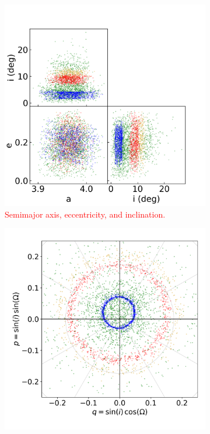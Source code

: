 \documentclass[a4paper,fleqn]{cas-sc}
\begin{document}
\begin{linenumbers}
\begin{figure}
    \centering
    \begin{subfigure}[t]{0.48\textwidth}
        \centering
        \includegraphics[width=\linewidth]{figure2a.png} 
        \caption{\textcolor{red}{Semimajor axis, eccentricity, and inclination.
}} \label{fig:plot_aei_allgroups_15.69}
    \end{subfigure}
    \hfill
    \begin{subfigure}[t]{0.48\textwidth}
        \centering
        \includegraphics[width=\linewidth]{figure2b.png} 

\end{subfigure}
\end{figure}
\end{linenumbers}
\end{document}

